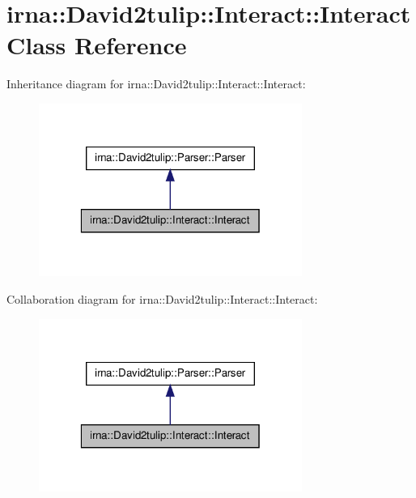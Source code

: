 \hypertarget{classirna_1_1David2tulip_1_1Interact_1_1Interact}{
\section{irna\-:\-:\-David2tulip\-:\-:\-Interact\-:\-:\-Interact \-Class \-Reference}
\label{classirna_1_1David2tulip_1_1Interact_1_1Interact}
}


\-Inheritance diagram for irna\-:\-:\-David2tulip\-:\-:\-Interact\-:\-:\-Interact\-:\nopagebreak
\begin{figure}[H]
\begin{center}
\leavevmode
\includegraphics[width=244pt]{classirna_1_1David2tulip_1_1Interact_1_1Interact__inherit__graph}
\end{center}
\end{figure}


\-Collaboration diagram for irna\-:\-:\-David2tulip\-:\-:\-Interact\-:\-:\-Interact\-:\nopagebreak
\begin{figure}[H]
\begin{center}
\leavevmode
\includegraphics[width=244pt]{classirna_1_1David2tulip_1_1Interact_1_1Interact__coll__graph}
\end{center}
\end{figure}
